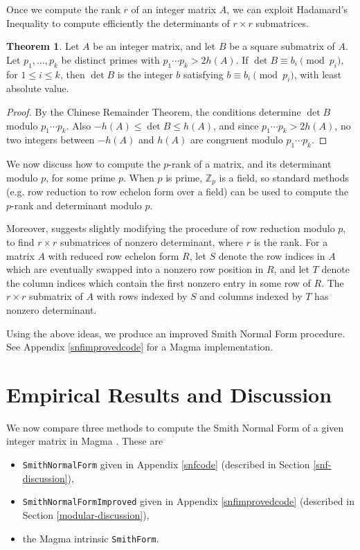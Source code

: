 \documentclass[12pt,a4paper,answers]{exam}
\newcommand{\Z}{\mathbb{Z}}
\theoremstyle{definition}
\newtheorem{theorem}{Theorem}[section]
\begin{document}
Once we compute the rank $r$ of an integer matrix $A$, we can exploit Hadamard's Inequality to compute efficiently the determinants of $r\times r$ submatrices.

\begin{theorem}
  Let $A$ be an integer matrix, and let $B$ be a square submatrix of $A$. Let $p_1,\ldots,p_k$ be distinct primes with $p_1\cdots p_k>2h(A)$. If $\det B\equiv b_i\pmod{p_i}$, for $1\leq i\leq k$, then $\det B$ is the integer $b$ satisfying $b\equiv b_i\pmod{p_i}$, with least absolute value.
\end{theorem}

\begin{proof}
  By the Chinese Remainder Theorem, the conditions determine $\det B$ modulo $p_1\cdots p_k$. Also $-h(A)\leq\det B\leq h(A)$, and since $p_1\cdots p_k>2h(A)$, no two integers between $-h(A)$ and $h(A)$ are congruent modulo $p_1\cdots p_k$. 
\end{proof}

We now discuss how to compute the $p$-rank of a matrix, and its determinant modulo $p$, for some prime $p$. When $p$ is prime, $\Z_p$ is a field, so standard methods (e.g. row reduction to row echelon form over a field) can be used to compute the $p$-rank and determinant modulo $p$.

Moreover, \cite{sims} suggests slightly modifying the procedure of row reduction modulo $p$, to find $r\times r$ submatrices of nonzero determinant, where $r$ is the rank. For a matrix $A$ with reduced row echelon form $R$, let $S$ denote the row indices in $A$ which are eventually swapped into a nonzero row position in $R$, and let $T$ denote the column indices which contain the first nonzero entry in some row of $R$. The $r\times r$ submatrix of $A$ with rows indexed by $S$ and columns indexed by $T$ has nonzero determinant.

Using the above ideas, we produce an improved Smith Normal Form procedure. See Appendix \ref{snfimprovedcode} for a {\sc Magma} implementation.

\section{Empirical Results and Discussion}
\label{conclusion}

We now compare three methods to compute the Smith Normal Form of a given integer matrix in {\sc Magma} \cite{magma}. These are
\begin{itemize}
\item \texttt{SmithNormalForm} given in Appendix \ref{snfcode} (described in Section \ref{snf-discussion}), \item \texttt{SmithNormalFormImproved} given in Appendix \ref{snfimprovedcode} (described in Section \ref{modular-discussion}),
\item the {\sc Magma} intrinsic \texttt{SmithForm}.
\end{itemize}
\end{document}
